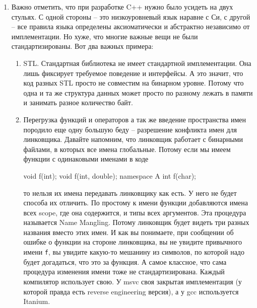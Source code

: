 \begin{enumerate}
\item %
Важно отметить, что при разработке C++ нужно было усидеть на двух стульях.
С одной стороны -- это низкоуровневый язык наравне с Си, с другой -- все правила языка определены аксиоматически и абстрактно независимо от имплементации.
Но хуже, что многие важные вещи не были стандартизированы.
Вот два важных примера:
\begin{enumerate}
\item STL.
Стандартная библиотека не имеет стандартной имплементации.
Она лишь фиксирует требуемое поведение и интерфейсы.
А это значит, что код разных STL просто не совместим на бинарном уровне.
Потому что одна и та же структура данных может просто по разному лежать в памяти и занимать разное количество байт.

\item Перегрузка функций и операторов а так же введение пространства имен породило еще одну большую беду -- разрешение конфликта имен для линковщика.
Давайте напомним, что линковщик работает с бинарными файлами, в которых все имена глобальные.
Потому если мы имеем функции с одинаковыми именами в коде
\begin{cppcode}
void f(int);
void f(int, double);
namespace A {
int f(char);
}
\end{cppcode}
то нельзя их имена передавать линковщику как есть.
У него не будет способа их отличить.
По простому к имени функции добавляются имена всех scope, где она содержится, и типы всех аргументов.
Эта процедура называется Name Mangling.
Потому линковщик будет видеть три разных названия вместо этих имен.
И как вы понимаете, при сообщении об ошибке о функции на стороне линковщика, вы не увидите привычного имени \verb"f", вы увидите какую-то мешанину из символов, по которой надо будет догадаться, что это за функция.
А самое классное, что сама процедура изменения имени тоже не стандартизирована.
Каждый компилятор использует свою.
У msvc своя закрытая имплементация (у которой правда есть reverse engineering версия), а у gcc используется Itanium.
\end{enumerate}
\end{enumerate}
